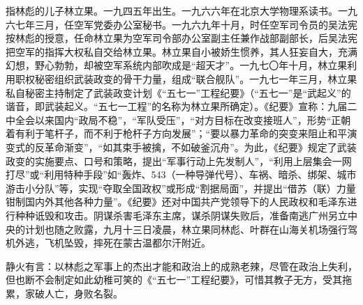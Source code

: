 \begin{maonote}
指林彪的儿子林立果。一九四五年出生。一九六六年在北京大学物理系读书。一九六七年三月，任空军党委办公室秘书。一九六九年十月，时任空军司令员的吴法宪按林彪的授意，任命林立果为空军司令部办公室副主任兼作战部副部长，后吴法宪把空军的指挥大权私自交给林立果。林立果自小被娇生惯养，其人狂妄自大，充满幻想，野心勃勃，却被空军系统内部吹成是“超天才”。一九七〇年十月，林立果利用职权秘密组织武装政变的骨干力量，组成“联合舰队”。一九七一年三月，林立果私自秘密主持制定了武装政变计划《“五七一”工程纪要》（“五七一”是“武起义”的谐音，即武装起义。“五七一工程”的名称为林立果所确定）。《纪要》宣称：九届二中全会以来国内“政局不稳”，“军队受压”，“对方目标在改变接班人”，形势“正朝着有利于笔杆子，而不利于枪杆子方向发展”；“要以暴力革命的突变来阻止和平演变式的反革命渐变”，“如其束手被擒，不如破釜沉舟”。为此，《纪要》规定了武装政变的实施要点、口号和策略，提出“军事行动上先发制人”，“利用上层集会一网打尽”或“利用特种手段”如“轰炸、543（一种导弹代号）、车祸、暗杀、绑架、城市游击小分队”等，实现“夺取全国政权”或形成“割据局面”，并提出“借苏（联）力量钳制国内外其他各种力量”。《纪要》还对中国共产党领导下的人民政权和毛泽东进行种种诋毁和攻击。阴谋杀害毛泽东主席，谋杀阴谋失败后，准备南逃广州另立中央的计划也随之败露，九月十三日凌晨，林立果同林彪、叶群在山海关机场强行驾机外逃，飞机坠毁，摔死在蒙古温都尔汗附近。

静火有言：以林彪之军事上的杰出才能和政治上的成熟老辣，尽管在政治上失利，但也断不会制定如此幼稚可笑的《“五七一”工程纪要》，可惜其教子无方，受其拖累，家破人亡，身败名裂。
\end{maonote}
